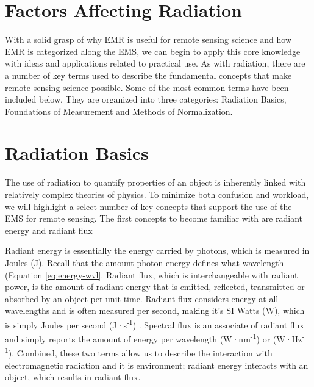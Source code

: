 \documentclass[
]{book}
\begin{document}
\hypertarget{factors-affecting-radiation}{%
\section{Factors Affecting Radiation}\label{factors-affecting-radiation}}

With a solid grasp of why EMR is useful for remote sensing science and
how EMR is categorized along the EMS, we can begin to apply this core
knowledge with ideas and applications related to practical use. As with
radiation, there are a number of key terms used to describe the
fundamental concepts that make remote sensing science possible. Some of
the most common terms have been included below. They are organized into
three categories: Radiation Basics, Foundations of Measurement and
Methods of Normalization.

\hypertarget{radiation-basics}{%
\section{Radiation Basics}\label{radiation-basics}}

The use of radiation to quantify properties of an object is
inherently linked with relatively complex theories of physics. To
minimize both confusion and workload, we will highlight a select number
of key concepts that support the use of the EMS for remote sensing. The
first concepts to become familiar with are radiant energy and
radiant flux

Radiant energy is essentially the energy carried by photons,
which is measured in Joules (J). Recall that the amount photon
energy defines what wavelength (Equation \eqref{eq:energy-wvl}.
Radiant flux, which is interchangeable with radiant power, is the amount
of radiant energy that is emitted, reflected, transmitted or
absorbed by an object per unit time. Radiant flux considers energy
at all wavelengths and is often measured per second, making it's SI
Watts (W), which is simply Joules per second (J·s\textsuperscript{-1}) . Spectral flux is an
associate of radiant flux and simply reports the amount of energy
per wavelength (W·nm\textsuperscript{-1}) or (W·Hz\textsuperscript{-1}). Combined, these two terms allow us to
describe the interaction with electromagnetic radiation and it is
environment; radiant energy interacts with an object, which results
in radiant flux.
\end{document}
